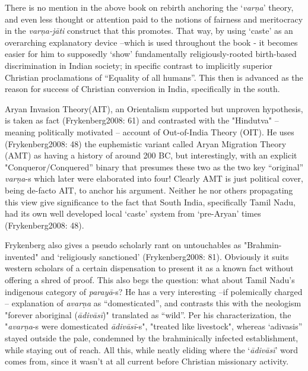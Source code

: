 There is no mention in the above book on rebirth anchoring the ‘\textit{varṇa}’ theory, and even less thought or attention paid to the notions of fairness and meritocracy in the \textit{varṇa-jāti} construct that this promotes. That way, by using ‘caste’ as an overarching explanatory device –which is used throughout the book - it becomes easier for him to supposedly ‘show’ fundamentally religiously-rooted birth-based discrimination in Indian society; in specific contrast to implicitly superior Christian proclamations of “Equality of all humans”. This then is advanced as the reason for success of Christian conversion in India, specifically in the south.

Aryan Invasion Theory(AIT), an Orientalism supported but unproven hypothesis, is taken as fact (Frykenberg2008: 61) and contrasted with the "Hindutva" – meaning politically motivated – account of Out-of-India Theory (OIT). He uses (Frykenberg2008: 48) the euphemistic variant called Aryan Migration Theory (AMT) as having a history of around 200 BC, but interestingly, with an explicit "Conqueror/Conquered” binary that presumes these two as the two key “original” \textit{varṇa}-s which later were elaborated into four! Clearly AMT is just political cover, being de-facto AIT, to anchor his argument. Neither he nor others propagating this view give significance to the fact that South India, specifically Tamil Nadu, had its own well developed local ‘caste’ system from ‘pre-Aryan’ times (Frykenberg2008: 48).

Frykenberg also gives a pseudo scholarly rant on untouchables as "Brahmin-invented" and ‘religiously sanctioned’ (Frykenberg2008: 81). Obviously it suits western scholars of a certain dispensation to present it as a known fact without offering a shred of proof. This also begs the question: what about Tamil Nadu’s indigenous category of \textit{parayā}-s? He has a very interesting –if polemically charged – explanation of \textit{avarṇa} as “domesticated”, and contrasts this with the neologism "forever aboriginal (\textit{ādivāsī})" translated as “wild”. Per his characterization, the "\textit{avarṇa}-s were domesticated \textit{ādivāsī}-s", "treated like livestock", whereas ‘adivasis” stayed outside the pale, condemned by the brahminically infected establishment, while staying out of reach. All this, while neatly eliding where the ‘\textit{ādivāsī}’ word comes from, since it wasn’t at all current before Christian missionary activity.

